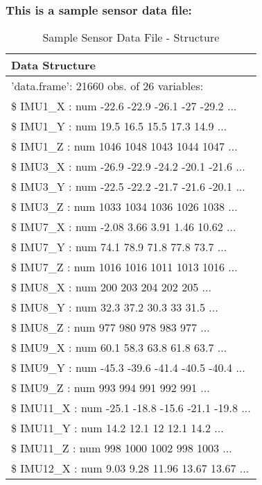 \documentclass[]{article}
\begin{document}
\hypertarget{this-is-a-sample-sensor-data-file}{%
\subsubsection{This is a sample sensor data
file:}\label{this-is-a-sample-sensor-data-file}}

\begin{table}[!h]

\caption{\label{tab:strsdfiles}Sample Sensor Data File - Structure}
\centering
\begin{tabular}[t]{l}
\hline
Data Structure\\
\hline
'data.frame':   21660 obs. of  26 variables:\\
\hline
\$ IMU1\_X      : num  -22.6 -22.9 -26.1 -27 -29.2 ...\\
\hline
\$ IMU1\_Y      : num  19.5 16.5 15.5 17.3 14.9 ...\\
\hline
\$ IMU1\_Z      : num  1046 1048 1043 1044 1047 ...\\
\hline
\$ IMU3\_X      : num  -26.9 -22.9 -24.2 -20.1 -21.6 ...\\
\hline
\$ IMU3\_Y      : num  -22.5 -22.2 -21.7 -21.6 -20.1 ...\\
\hline
\$ IMU3\_Z      : num  1033 1034 1036 1026 1038 ...\\
\hline
\$ IMU7\_X      : num  -2.08 3.66 3.91 1.46 10.62 ...\\
\hline
\$ IMU7\_Y      : num  74.1 78.9 71.8 77.8 73.7 ...\\
\hline
\$ IMU7\_Z      : num  1016 1016 1011 1013 1016 ...\\
\hline
\$ IMU8\_X      : num  200 203 204 202 205 ...\\
\hline
\$ IMU8\_Y      : num  32.3 37.2 30.3 33 31.5 ...\\
\hline
\$ IMU8\_Z      : num  977 980 978 983 977 ...\\
\hline
\$ IMU9\_X      : num  60.1 58.3 63.8 61.8 63.7 ...\\
\hline
\$ IMU9\_Y      : num  -45.3 -39.6 -41.4 -40.5 -40.4 ...\\
\hline
\$ IMU9\_Z      : num  993 994 991 992 991 ...\\
\hline
\$ IMU11\_X     : num  -25.1 -18.8 -15.6 -21.1 -19.8 ...\\
\hline
\$ IMU11\_Y     : num  14.2 12.1 12 12.1 14.2 ...\\
\hline
\$ IMU11\_Z     : num  998 1000 1002 998 1003 ...\\
\hline
\$ IMU12\_X     : num  9.03 9.28 11.96 13.67 13.67 ...\\

\end{tabular}
\end{table}
\end{document}
